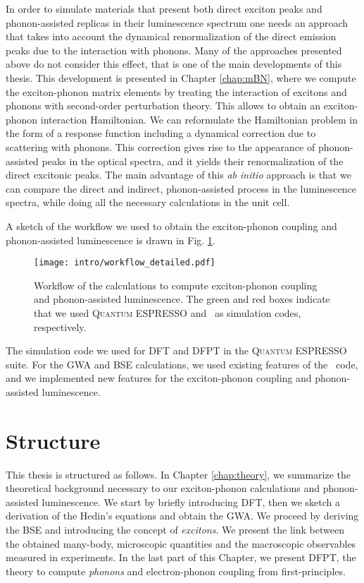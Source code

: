 In order to simulate materials that present both direct exciton
peaks and phonon-assisted replicas in their luminescence spectrum one needs an approach that takes into account the dynamical renormalization of the direct emission peaks due
to the interaction with phonons. Many of the approaches presented above do not consider this effect, that is one of the main developments of this thesis.
This development is presented in Chapter \ref{chap:mBN}, where we compute the exciton-phonon matrix elements by treating the interaction of excitons and phonons with second-order perturbation theory. This allows to obtain an exciton-phonon interaction Hamiltonian. We can reformulate the Hamiltonian problem in the form of a response function including a dynamical correction due to scattering with phonons. This correction gives rise to the appearance of phonon-assisted peaks in the optical spectra, and it yields their renormalization of the direct excitonic peaks. The main advantage of this \textit{ab initio} approach is that we can compare the direct and indirect, phonon-assisted process in the luminescence spectra, while doing all the necessary calculations in the unit cell.

A sketch of the workflow we used to obtain the exciton-phonon coupling and phonon-assisted luminescence is drawn in Fig. \ref{fig:workflow}.
\begin{figure}[t]
	\vspace{0.2cm}
	\setcapindent{2em}
	\centering
	\texttt{[image: intro/workflow\_detailed.pdf]}
	\caption{Workflow of the calculations to compute exciton-phonon coupling and phonon-assisted luminescence. The green and red boxes indicate that we used \textsc{Quantum ESPRESSO} and \yambo~as simulation codes, respectively.}
	\label{fig:workflow}
\end{figure}
The simulation code we used for \acrshort{DFT} and \acrshort{DFPT} in the \textsc{Quantum ESPRESSO} suite.\cite{giannozzi2009quantum,giannozzi2017advanced} For the \acrshort{GWA} and \acrshort{BSE} calculations, we used existing features of the \yambo~code,\cite{Sangalli_2019} and we implemented new features for the exciton-phonon coupling and phonon-assisted luminescence.

\section*{Structure}
This thesis is structured as follows. In Chapter \ref{chap:theory}, we summarize the theoretical background necessary to our exciton-phonon calculations and phonon-assisted luminescence. We start by briefly introducing \acrshort{DFT}, then we sketch a derivation of the Hedin's equations and obtain the \acrfull{GWA}. We proceed by deriving the \acrfull{BSE} and introducing the concept of \textit{excitons}. We present the link between the obtained many-body, microscopic quantities and the macroscopic observables measured in experiments. In the last part of this Chapter, we present \acrshort{DFPT}, the theory to compute \textit{phonons} and electron-phonon coupling from first-principles.

